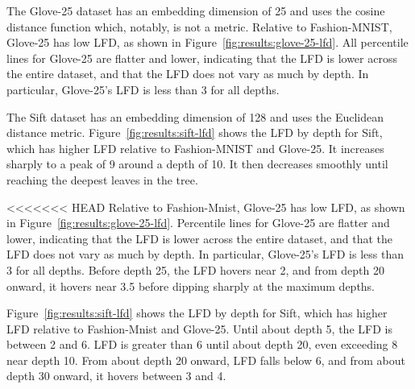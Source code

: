 The Glove-25 dataset has an embedding dimension of 25 and uses the cosine distance function which, notably, is not a metric.
Relative to Fashion-MNIST, Glove-25 has low LFD, as shown in Figure~\ref{fig:results:glove-25-lfd}.
All percentile lines for Glove-25 are flatter and lower, indicating that the LFD is lower across the entire dataset, and that the LFD does not vary as much by depth.
In particular, Glove-25's LFD is less than 3 for all depths.

The Sift dataset has an embedding dimension of 128 and uses the Euclidean distance metric.
Figure~\ref{fig:results:sift-lfd} shows the LFD by depth for Sift, which has higher LFD relative to Fashion-MNIST and Glove-25.
It increases sharply to a peak of 9 around a depth of 10.
It then decreases smoothly until reaching the deepest leaves in the tree.

<<<<<<< HEAD
Relative to Fashion-Mnist, Glove-25 has low LFD, as shown in Figure~\ref{fig:results:glove-25-lfd}.
Percentile lines for Glove-25 are flatter and lower, indicating that the LFD is lower across the entire dataset, and that the LFD does not vary as much by depth.
In particular, Glove-25's LFD is less than 3 for all depths.
Before depth 25, the LFD hovers near 2, and from depth 20 onward, it hovers near 3.5 before dipping sharply at the maximum depths.



Figure~\ref{fig:results:sift-lfd} shows the LFD by depth for Sift, which has higher LFD relative to Fashion-Mnist and Glove-25.
Until about depth 5, the LFD is between 2 and 6. LFD is greater than 6 until about depth 20, even exceeding 8 near depth 10.
From about depth 20 onward, LFD falls below 6, and from about depth 30 onward, it hovers between 3 and 4.

